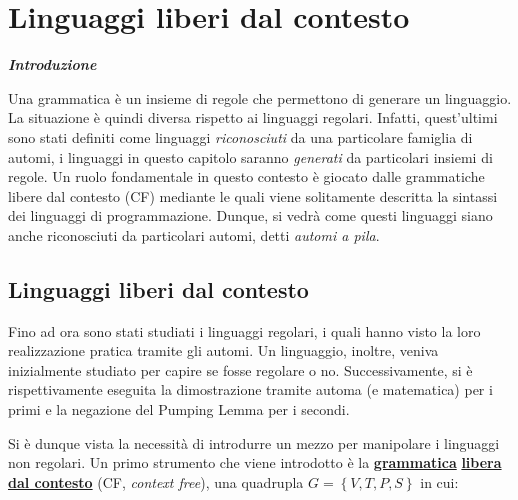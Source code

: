 \documentclass[a4paper]{article}
\begin{document}
	\newpage
	
	\section{Linguaggi liberi dal contesto}
	
	\begin{center}
		\large
		\textbf{\emph{Introduzione}}
	\end{center}
	
	Una grammatica è un insieme di regole che permettono di generare un linguaggio. La situazione è quindi diversa rispetto ai linguaggi regolari. Infatti, quest'ultimi sono stati definiti come linguaggi \emph{riconosciuti} da una particolare famiglia di automi, i linguaggi in questo capitolo saranno \emph{generati} da particolari insiemi di regole. Un ruolo fondamentale in questo contesto è giocato dalle grammatiche libere dal contesto (CF) mediante le quali viene solitamente descritta la sintassi dei linguaggi di programmazione. Dunque, si vedrà come questi linguaggi siano anche riconosciuti da particolari automi, detti \emph{automi a pila}.
	
	\subsection{Linguaggi liberi dal contesto}
	
	Fino ad ora sono stati studiati i linguaggi regolari, i quali hanno visto la loro realizzazione pratica tramite gli automi. Un linguaggio, inoltre, veniva inizialmente studiato per capire se fosse regolare o no. Successivamente, si è rispettivamente eseguita la dimostrazione tramite automa (e matematica) per i primi e la negazione del Pumping Lemma per i secondi.
	
	Si è dunque vista la necessità di introdurre un mezzo per manipolare i linguaggi non regolari. Un primo strumento che viene introdotto è la \textcolor{Red3}{\textbf{\underline{grammatica}}} \textcolor{Red3}{\textbf{\underline{libera dal contesto}}} (CF, \emph{context free}), una quadrupla $G = \left\lbrace V, T, P, S \right\rbrace$ in cui:
	
\end{document}
